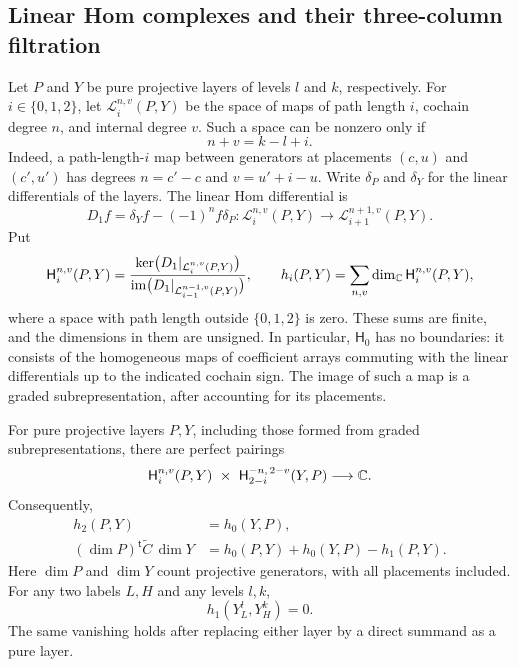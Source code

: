 \subsection{Linear Hom complexes and their three-column filtration}

Let $P$ and $Y$ be pure projective layers of levels $l$ and $k$, respectively.
For $i\in\{0,1,2\}$, let
$\mathcal L_i^{n,v}(P,Y)$ be the space of maps of path length $i$, cochain
degree $n$, and internal degree $v$.  Such a space can be nonzero only if
\begin{equation}
 n+v=k-l+i.
 \label{eq:rigidity-hom-degree}
\end{equation}
Indeed, a path-length-$i$ map between generators at placements $(c,u)$
and $(c',u')$ has degrees $n=c'-c$ and $v=u'+i-u$.
Write $\delta_P$ and $\delta_Y$ for the linear differentials of the layers.
The linear Hom differential is
\[
 D_1f=\delta_Yf-(-1)^n f\delta_P:
 \mathcal L_i^{n,v}(P,Y)\longrightarrow
 \mathcal L_{i+1}^{n+1,v}(P,Y).
\]
Put
\[
 \mathsf H_i^{n,v}(P,Y)=
 \frac{\ker\bigl(D_1|_{\mathcal L_i^{n,v}(P,Y)}\bigr)}
 {\operatorname{im}\bigl(D_1|_{\mathcal L_{i-1}^{n-1,v}(P,Y)}\bigr)},
 \qquad
 h_i(P,Y)=\sum_{n,v}\dim_{\mathbb C}\mathsf H_i^{n,v}(P,Y),
\]
where a space with path length outside $\{0,1,2\}$ is zero.  These sums are
finite, and the dimensions in them are unsigned.  In particular,
$\mathsf H_0$ has no boundaries: it consists of the homogeneous maps of
coefficient arrays commuting with the linear differentials up to the
indicated cochain sign.  The image of such a map is a graded
subrepresentation, after accounting for its placements.

\begin{lemma}
\label{lem:rigidity-hom-filtration}
For pure projective layers $P,Y$, including those formed from graded
subrepresentations, there are perfect pairings
\[
 \mathsf H_i^{n,v}(P,Y)\ \times\
 \mathsf H_{2-i}^{-n,\,2-v}(Y,P)\longrightarrow\mathbb C.
\]
Consequently,
\begin{equation}
 \begin{split}
 h_2(P,Y)&=h_0(Y,P),\\
 (\dim P)^{\mathsf t}\widetilde C\,\dim Y
   &=h_0(P,Y)+h_0(Y,P)-h_1(P,Y).
 \end{split}
 \label{eq:rigidity-euler}
\end{equation}
Here $\dim P$ and $\dim Y$ count projective generators, with all placements
included.  For any two labels $L,H$ and any levels $l,k$,
\begin{equation}
 h_1(Y_L^l,Y_H^k)=0.
 \label{eq:rigidity-middle-vanishing}
\end{equation}
The same vanishing holds after replacing either layer by a direct summand
as a pure layer.
\end{lemma}

